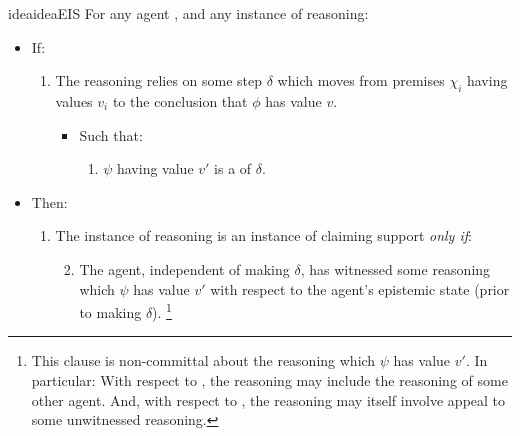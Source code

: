 \begin{note}
  \begin{restatable}{idea}{ideaEIS}
    \label{idea:CS:B}
    For any agent \vAgent{}, and any instance of reasoning:
    \begin{itemize}[leftmargin=*]
    \item
      If:
      \begin{enumerate}[label=\arabic*., ref=(\arabic*)]
      \item
        \label{idea:CS:B:step}
        The reasoning relies on some step \(\delta\) which moves from premises \(\chi_{i}\) having values \(v_{i}\) to the conclusion that \(\phi\) has value \(v\).
        \begin{itemize}
        \item
          Such that:
          \begin{enumerate}[label=\alph*., ref=(\alph*)]
          \item
            \label{idea:CS:B:step:requ}
            \(\psi\) having value \(v'\) is a \emph{\requ{}} of \(\delta\).
          \end{enumerate}
        \end{itemize}
      \end{enumerate}
    \item
      Then:
      \begin{enumerate}[label=\arabic*., ref=(\arabic*)]
      \item
        The instance of reasoning is an instance of claiming support \emph{only if}:
        \begin{enumerate}[label=\alph*., ref=(\alph*)]
          \setcounter{enumii}{1}
        \item
          \label{idea:CS:B:prior-reasoning}
          The agent, independent of making \(\delta\), has witnessed some reasoning which  \(\psi\) has value \(v'\) with respect to the agent's epistemic state (prior to making \(\delta\)).\nolinebreak
          \footnote{
            This clause is non-committal about the reasoning which  \(\psi\) has value \(v'\).
            In particular:
            With respect to \ESU{}, the reasoning may include the reasoning of some other agent.
            And, with respect to \EAS{}, the reasoning may itself involve appeal to some unwitnessed reasoning.
          }
        \end{enumerate}
      \end{enumerate}
    \end{itemize}
    \vspace{-\baselineskip}
  \end{restatable}
\end{note}

